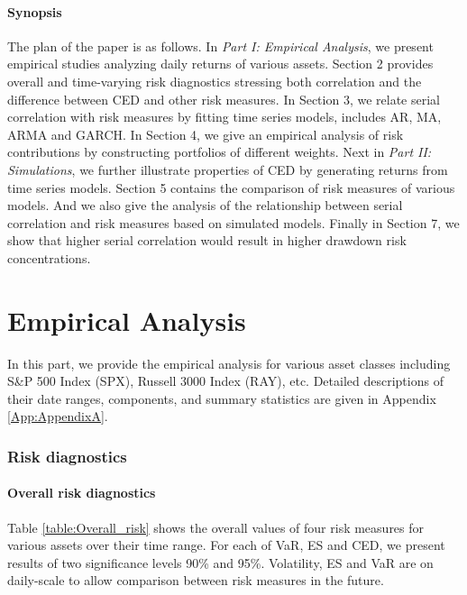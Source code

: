 \documentclass[11pt]{article}
\begin{document}
\subsection{Synopsis}

The plan of the paper is as follows. In \emph{Part I: Empirical Analysis}, we present empirical studies analyzing daily returns of various assets. Section 2 provides overall and time-varying risk diagnostics stressing both correlation and the difference between CED and other risk measures. In Section 3, we relate serial correlation with risk measures by fitting time series models, includes AR, MA, ARMA and GARCH. In Section 4, we give an empirical analysis of risk contributions by constructing portfolios of different weights. Next in \emph{Part II: Simulations}, we further illustrate properties of CED by generating returns from time series models. Section 5 contains the comparison of risk measures of various models. And we also give the analysis of the relationship between serial correlation and risk measures based on simulated models. Finally in Section 7, we show that higher serial correlation would result in higher drawdown risk concentrations.

\part{Empirical Analysis}

In this part, we provide the empirical analysis for various asset classes including S\&P 500 Index (SPX), Russell 3000 Index (RAY), etc. Detailed descriptions of their date ranges, components, and summary statistics are given in Appendix \ref{App:AppendixA}.

\section{Risk diagnostics}

\subsection{Overall risk diagnostics}

Table \ref{table:Overall_risk} shows the overall values of four risk measures for various assets over their time range. For each of VaR, ES and CED, we present results of two significance levels 90\% and 95\%. Volatility, ES and VaR are on daily-scale to allow comparison between risk measures in the future. 
\end{document}
